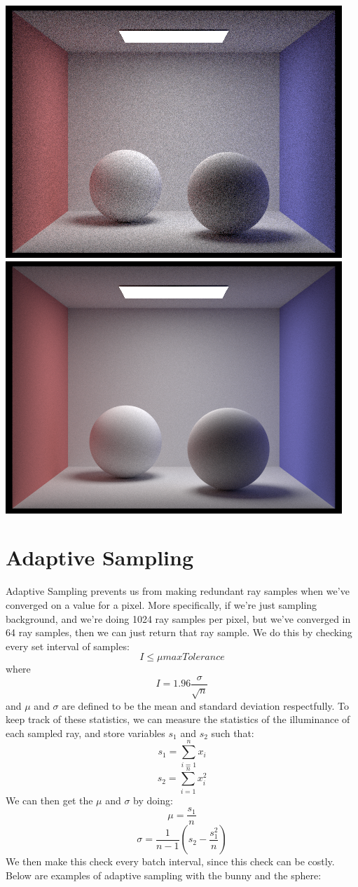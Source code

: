 \documentclass{article}
\begin{document}
\begin{center}
    \includegraphics[width=\textwidth]{task4/spheres_64_4.png}
    \includegraphics[width=\textwidth]{task4/spheres_1024_4.png}
\end{center}
\newpage
\section{Adaptive Sampling}
Adaptive Sampling prevents us from making redundant ray samples when we've converged on a value for a pixel. More specifically, if we're just sampling background, and we're doing 1024 ray samples per pixel, but we've converged in 64 ray samples, then we can just return that ray sample. We do this by checking every set interval of samples:
$$I \leq \mu maxTolerance$$
where $$I = 1.96 \frac{\sigma}{\sqrt{n}}$$
and $\mu$ and $\sigma$ are defined to be the mean and standard deviation respectfully. To keep track of these statistics, we can measure the statistics of the illuminance of each sampled ray, and store variables $s_1$ and $s_2$ such that:
$$s_1 =\sum_{i = 1}^n x_i$$
$$s_2 = \sum_{i = 1}^n x_i^2$$
We can then get the $\mu$ and $\sigma$ by doing:
$$\mu = \frac{s_1}{n}$$
$$\sigma = \frac{1}{n - 1}(s_2 - \frac{s_1^2}{n})$$
We then make this check every batch interval, since this check can be costly. Below are examples of adaptive sampling with the bunny and the sphere:
\end{document}
